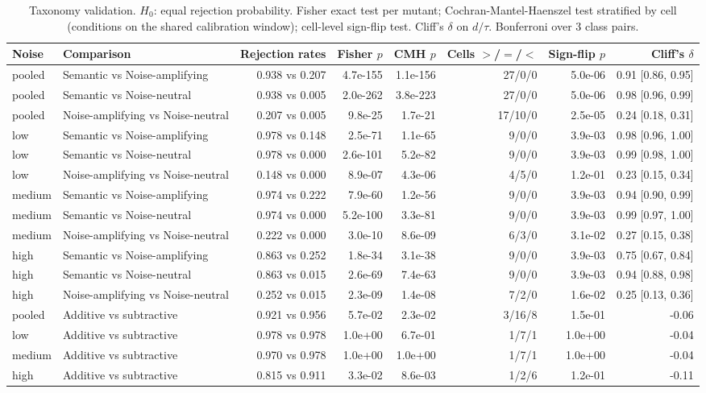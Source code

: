 \begin{table}[t]
\centering
\caption{Taxonomy validation. $H_0$: equal rejection probability. Fisher exact test per mutant; Cochran-Mantel-Haenszel test stratified by cell (conditions on the shared calibration window); cell-level sign-flip test. Cliff's $\delta$ on $d/\tau$. Bonferroni over 3 class pairs.}
\label{tab:rq2-taxonomy}
\small
\begin{tabular}{llrrrrrr}
\toprule
Noise & Comparison & Rejection rates & Fisher $p$ & CMH $p$ & Cells $>$/$=$/$<$ & Sign-flip $p$ & Cliff's $\delta$ \\
\midrule
pooled & Semantic vs Noise-amplifying & 0.938 vs 0.207 & 4.7e-155 & 1.1e-156 & 27/0/0 & 5.0e-06 & 0.91 [0.86, 0.95] \\
pooled & Semantic vs Noise-neutral & 0.938 vs 0.005 & 2.0e-262 & 3.8e-223 & 27/0/0 & 5.0e-06 & 0.98 [0.96, 0.99] \\
pooled & Noise-amplifying vs Noise-neutral & 0.207 vs 0.005 & 9.8e-25 & 1.7e-21 & 17/10/0 & 2.5e-05 & 0.24 [0.18, 0.31] \\
low & Semantic vs Noise-amplifying & 0.978 vs 0.148 & 2.5e-71 & 1.1e-65 & 9/0/0 & 3.9e-03 & 0.98 [0.96, 1.00] \\
low & Semantic vs Noise-neutral & 0.978 vs 0.000 & 2.6e-101 & 5.2e-82 & 9/0/0 & 3.9e-03 & 0.99 [0.98, 1.00] \\
low & Noise-amplifying vs Noise-neutral & 0.148 vs 0.000 & 8.9e-07 & 4.3e-06 & 4/5/0 & 1.2e-01 & 0.23 [0.15, 0.34] \\
medium & Semantic vs Noise-amplifying & 0.974 vs 0.222 & 7.9e-60 & 1.2e-56 & 9/0/0 & 3.9e-03 & 0.94 [0.90, 0.99] \\
medium & Semantic vs Noise-neutral & 0.974 vs 0.000 & 5.2e-100 & 3.3e-81 & 9/0/0 & 3.9e-03 & 0.99 [0.97, 1.00] \\
medium & Noise-amplifying vs Noise-neutral & 0.222 vs 0.000 & 3.0e-10 & 8.6e-09 & 6/3/0 & 3.1e-02 & 0.27 [0.15, 0.38] \\
high & Semantic vs Noise-amplifying & 0.863 vs 0.252 & 1.8e-34 & 3.1e-38 & 9/0/0 & 3.9e-03 & 0.75 [0.67, 0.84] \\
high & Semantic vs Noise-neutral & 0.863 vs 0.015 & 2.6e-69 & 7.4e-63 & 9/0/0 & 3.9e-03 & 0.94 [0.88, 0.98] \\
high & Noise-amplifying vs Noise-neutral & 0.252 vs 0.015 & 2.3e-09 & 1.4e-08 & 7/2/0 & 1.6e-02 & 0.25 [0.13, 0.36] \\
pooled & Additive vs subtractive & 0.921 vs 0.956 & 5.7e-02 & 2.3e-02 & 3/16/8 & 1.5e-01 & -0.06 \\
low & Additive vs subtractive & 0.978 vs 0.978 & 1.0e+00 & 6.7e-01 & 1/7/1 & 1.0e+00 & -0.04 \\
medium & Additive vs subtractive & 0.970 vs 0.978 & 1.0e+00 & 1.0e+00 & 1/7/1 & 1.0e+00 & -0.04 \\
high & Additive vs subtractive & 0.815 vs 0.911 & 3.3e-02 & 8.6e-03 & 1/2/6 & 1.2e-01 & -0.11 \\
\bottomrule
\end{tabular}
\end{table}
